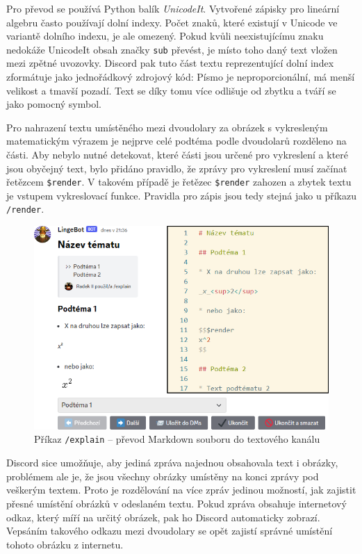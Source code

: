 \documentclass[FM]{tulthesis}
\begin{document}
	Pro převod se používá Python balík \textit{UnicodeIt}. Vytvořené zápisky pro lineární algebru často používají dolní indexy. Počet znaků, které existují v Unicode ve variantě dolního indexu, je ale omezený. Pokud kvůli neexistujícímu znaku nedokáže UnicodeIt obsah značky \verb|sub| převést, je místo toho daný text vložen mezi zpětné uvozovky. Discord pak tuto část textu reprezentující dolní index zformátuje jako jednořádkový zdrojový kód: Písmo je neproporcionální, má menší velikost a tmavší pozadí. Text se díky tomu více odlišuje od zbytku a tváří se jako pomocný symbol.
	
	Pro nahrazení textu umístěného mezi dvoudolary za obrázek s vykresleným matematickým výrazem je nejprve celé podtéma podle dvoudolarů rozděleno na části. Aby nebylo nutné detekovat, které části jsou určené pro vykreslení a které jsou obyčejný text, bylo přidáno pravidlo, že zprávy pro vykreslení musí začínat řetězcem \verb|$render|. V takovém případě je řetězec \verb|$render| zahozen a zbytek textu je vstupem vykreslovací funkce. Pravidla pro zápis jsou tedy stejná jako u příkazu \verb|/render|.
	
	\begin{figure}[ht]
		\centering
		\includegraphics[width=\textwidth]{img/5X/Explain1}
		\caption{Příkaz \texttt{/explain} – převod Markdown souboru do textového kanálu}
	\end{figure}
	
	Discord sice umožňuje, aby jediná zpráva najednou obsahovala text i obrázky, problémem ale je, že jsou všechny obrázky umístěny na konci zprávy pod veškerým textem. Proto je rozdělování na více zpráv jedinou možností, jak zajistit přesné umístění obrázků v odeslaném textu. Pokud zpráva obsahuje internetový odkaz, který míří na určitý obrázek, pak ho Discord automaticky zobrazí. Vepsáním takového odkazu mezi dvoudolary se opět zajistí správné umístění tohoto obrázku z internetu.
	
\end{document}

